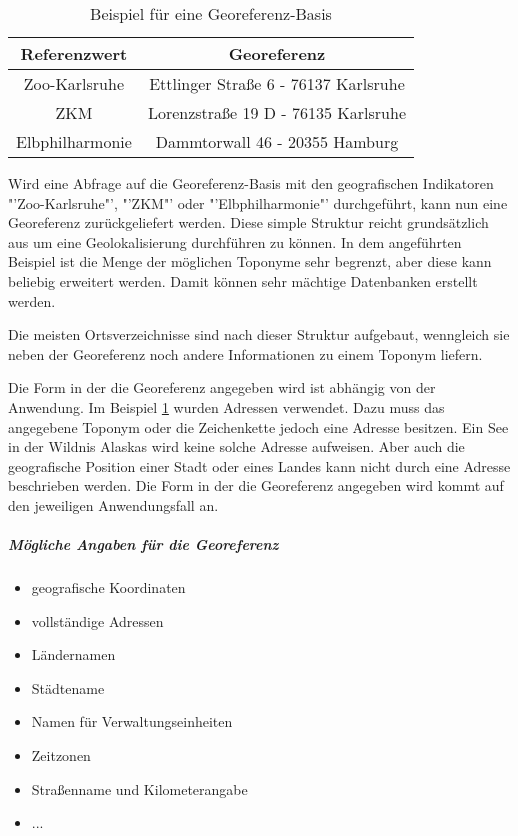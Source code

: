 		\begin{table}[htpb]
				\caption{Beispiel für eine Georeferenz-Basis} 
				\centering
				\begin{tabular}{|c||c|}
					\hline
					Referenzwert & Georeferenz \\
					\hline\hline
					Zoo-Karlsruhe & Ettlinger Straße 6 - 76137 Karlsruhe \\
					\hline
					ZKM & Lorenzstraße 19 D - 76135 Karlsruhe \\
					\hline
					Elbphilharmonie & Dammtorwall 46 - 20355 Hamburg \\
					\hline
				\end{tabular}
				\label{tab:simpleStruktur} 
		\end{table} 

		Wird eine Abfrage auf die Georeferenz-Basis mit den geografischen Indikatoren "'Zoo-Karlsruhe"', "'ZKM"' oder "'Elbphilharmonie"' durchgeführt, kann nun eine Georeferenz zurückgeliefert werden.
		Diese simple Struktur reicht grundsätzlich aus um eine Geolokalisierung durchführen zu können.
		In dem angeführten Beispiel ist die Menge der möglichen Toponyme sehr begrenzt, aber diese kann beliebig erweitert werden.
		Damit können sehr mächtige Datenbanken erstellt werden.

		Die meisten Ortsverzeichnisse sind nach dieser Struktur aufgebaut, wenngleich sie neben der Georeferenz noch andere Informationen zu einem Toponym liefern.

		Die Form in der die Georeferenz angegeben wird ist abhängig von der Anwendung. 
		Im Beispiel \ref{tab:simpleStruktur} wurden Adressen verwendet. 
		Dazu muss das angegebene Toponym oder die Zeichenkette jedoch eine Adresse besitzen. 
		Ein See in der Wildnis Alaskas wird keine solche Adresse aufweisen.
		Aber auch die geografische Position einer Stadt oder eines Landes kann nicht durch eine Adresse beschrieben werden. 
		Die Form in der die Georeferenz angegeben wird kommt auf den jeweiligen Anwendungsfall an.
		
		\subparagraph{Mögliche Angaben für die Georeferenz}

		\begin{itemize}
		  	 \item geografische Koordinaten
		  	 \item vollständige Adressen
		  	 \item Ländernamen
		  	 \item Städtename
		  	 \item Namen für Verwaltungseinheiten 
		  	 \item Zeitzonen
		  	 \item Straßenname und Kilometerangabe
		  	 \item ...
		  \end{itemize}  


